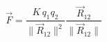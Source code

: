 \documentclass[preview]{standalone}
\begin{document}
\begin{align*}
\vec{F} = \dfrac{K \, q_1 q_2}{\lVert \vec{R}_{12} \rVert^2} \dfrac{\vec{R}_{12}}{\lVert \vec{R}_{12} \rVert}
\end{align*}
\end{document}
